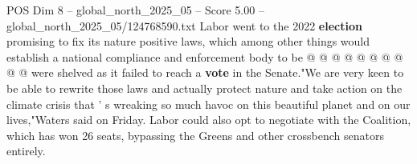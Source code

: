 \begin{textsample}{POS Dim 8 – global\_north\_2025\_05 – Score 5.00 – global\_north\_2025\_05/124768590.txt}
Labor went to the 2022 \textbf{election} promising to fix its nature positive laws, which among other things would establish a national compliance and enforcement body to be @ @ @ @ @ @ @ @ @ @ were shelved as it failed to reach a \textbf{vote} in the Senate."We are very keen to be able to rewrite those laws and actually protect nature and take action on the climate crisis that ' s wreaking so much havoc on this beautiful planet and on our lives,"Waters said on Friday.
Labor could also opt to negotiate with the Coalition, which has won 26 seats, bypassing the Greens and other crossbench senators entirely.

\end{textsample}
